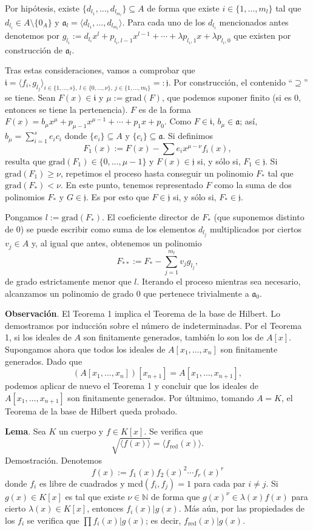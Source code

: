 \documentclass[a4paper,12pt]{article}
\newcommand{\N}{\mathbb{N}}
\newcommand{\af}{\mathfrak{a}}
\newcommand{\grad}{\text{grad}}
\begin{document}
Por hipótesis, existe $\{d_{l_1},\dots,d_{l_{m_l}}\}\subseteq A$ de forma que existe $i\in\{1,\dots,m_l\}$ tal que $d_{l_i}\in A\setminus\{0_A\}$ y $\af_l=\langle d_{l_1},\dots,d_{l_{m_l}}\rangle$. Para cada uno de los $d_{l_i}$ mencionados antes denotemos por $g_{l_i}:=d_{l_i}x^l+p_{l_i,l-1}x^{l-1}+\cdots+\lambda p_{l_i,1}x+\lambda p_{l_i,0}$ que existen por construcción de $\af_l$.

Tras estas consideraciones, vamos a comprobar que $\mathfrak{i}=\langle f_i,g_{l_j}\rangle_{i\in\{1,\dots,s\},\ l\in\{0,\dots,\nu\},\ j\in\{1,\dots,m_l\}}=:\mathfrak{j}$. Por construcción, el contenido ``$\supseteq$'' se tiene. Sean $F(x)\in\mathfrak{i}$ y $\mu:=\grad(F)$, que podemos suponer finito (si es $0$, entonces se tiene la pertenencia). $F$ es de la forma $F(x)=b_\mu x^\mu+p_{\mu-1}x^{\mu-1}+\cdots+p_1x+p_0$. 
Como $F\in\mathfrak{i}$, $b_\mu\in\af$; así, $b_\mu=\sum_{i=1}^se_ic_i$ donde $\{e_i\}\subseteq A$ y $\{c_i\}\subseteq\af$. Si definimos$$F_1(x):=F(x)-\sum e_ix^{\mu-\nu}f_i(x),$$
resulta que $\grad(F_1)\in\{0,\dots,\mu-1\}$ y $F(x)\in\mathfrak{j}$ si, y sólo si, $F_1\in\mathfrak{j}$. Si $\grad(F_1)\ge\nu$, repetimos el proceso hasta conseguir un polinomio $F_{*}$ tal que $\grad(F_*)<\nu$. En este punto, tenemos representado $F$ como la suma de dos polinomios $F_*$ y $G\in\mathfrak{j}$. Es por esto que $F\in\mathfrak{j}$ si, y sólo si, $F_*\in\mathfrak{j}$.

Pongamos $l:=\grad(F_*)$. El coeficiente director de $F_*$ (que suponemos distinto de $0$) se puede escribir como suma de los elementos $d_{l_j}$ multiplicados por ciertos $v_j\in A$ y, al igual que antes, obtenemos un polinomio$$F_{**}:=F_*-\sum_{j=1}^{m_l}v_jg_{l_j},$$de grado estrictamente menor que $l$. Iterando el proceso mientras sea necesario, alcanzamos un polinomio de grado $0$ que pertenece trivialmente a $\af_0$.

\textbf{Observación}. El Teorema 1 implica el Teorema de la base de Hilbert. Lo demostramos por inducción sobre el número de indeterminadas. Por el Teorema 1, si los ideales de $A$ son finitamente generados, también lo son los de $A[x]$. Supongamos ahora que todos los ideales de $A[x_1,\dots,x_n]$ son finitamente generados. Dado que$$(A[x_1,\dots,x_n])[x_{n+1}]=A[x_1,\dots,x_{n+1}],$$podemos aplicar de nuevo el Teorema 1 y concluir que los ideales de $A[x_1,\dots,x_{n+1}]$ son finitamente generados. Por últmimo, tomando $A=K$, el Teorema de la base de Hilbert queda probado.

\textbf{Lema}. Sea $K$ un cuerpo y $f\in K[x]$. Se verifica que$$\sqrt{\langle f(x)\rangle}=\langle f_{\text{red}}(x)\rangle.$$
Demostración. Denotemos$$f(x):=f_1(x)f_2(x)^2\cdots f_r(x)^r$$donde $f_i$ es libre de cuadrados y $\text{mcd}(f_i,f_j)=1$ para cada par $i\neq j$. Si $g(x)\in K[x]$ es tal que existe $\nu\in\N$ de forma que $g(x)^\nu\in\lambda(x)f(x)$ para cierto $\lambda(x)\in K[x]$, entonces $f_i(x)|g(x)$. Más aún, por las propiedades de los $f_i$ se verifica que $\prod f_i(x)|g(x)$; es decir, $f_\text{red}(x)|g(x)$.
\end{document}
